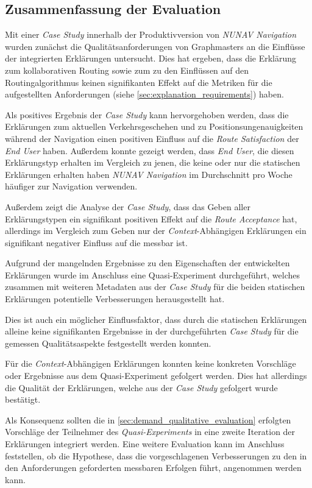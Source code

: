\subsection{Zusammenfassung der Evaluation}

Mit einer \textit{Case Study} innerhalb der Produktivversion von \textit{NUNAV Navigation} wurden zunächst die Qualitätsanforderungen von Graphmasters an die Einflüsse der integrierten Erklärungen untersucht. Dies hat ergeben, dass die Erklärung zum kollaborativen Routing sowie zum zu den Einflüssen auf den Routingalgorithmus keinen signifikanten Effekt auf die Metriken für die aufgestellten Anforderungen (siehe \autoref{sec:explanation_requirements}) haben.

Als positives Ergebnis der \textit{Case Study} kann hervorgehoben werden, dass die Erklärungen zum aktuellen Verkehrsgeschehen und zu Positionsungenauigkeiten während der Navigation einen positiven Einfluss auf die \textit{Route Satisfaction} der \textit{End User} haben. Außerdem konnte gezeigt werden, dass \textit{End User}, die diesen Erklärungstyp erhalten im Vergleich zu jenen, die keine oder nur die statischen Erklärungen erhalten haben \textit{NUNAV Navigation} im Durchschnitt pro Woche häufiger zur Navigation verwenden.

Außerdem zeigt die Analyse der \textit{Case Study}, dass das Geben aller Erklärungstypen ein signifikant positiven Effekt auf die \textit{Route Acceptance} hat, allerdings im Vergleich zum Geben nur der \textit{Context}-Abhängigen Erklärungen ein signifikant negativer Einfluss auf die  messbar ist.

Aufgrund der mangelnden Ergebnisse zu den Eigenschaften der entwickelten Erklärungen wurde im Anschluss eine Quasi-Experiment durchgeführt, welches zusammen mit weiteren Metadaten aus der \textit{Case Study} für die beiden statischen Erklärungen potentielle Verbesserungen herausgestellt hat.

Dies ist auch ein möglicher Einflussfaktor, dass durch die statischen Erklärungen alleine keine signifikanten Ergebnisse in der durchgeführten \textit{Case Study} für die gemessen Qualitätsaspekte festgestellt werden konnten.

Für die \textit{Context}-Abhängigen Erklärungen konnten keine konkreten Vorschläge oder Ergebnisse aus dem Quasi-Experiment gefolgert werden. Dies hat allerdings die Qualität der Erklärungen, welche aus der \textit{Case Study} gefolgert wurde bestätigt.

Als Konsequenz sollten die in \autoref{sec:demand_qualitative_evaluation} erfolgten Vorschläge der Teilnehmer des \textit{Quasi-Experiments} in eine zweite Iteration der Erklärungen integriert werden. Eine weitere Evaluation kann im Anschluss feststellen, ob die Hypothese, dass die vorgeschlagenen Verbesserungen zu den in den Anforderungen geforderten messbaren Erfolgen führt, angenommen werden kann.

